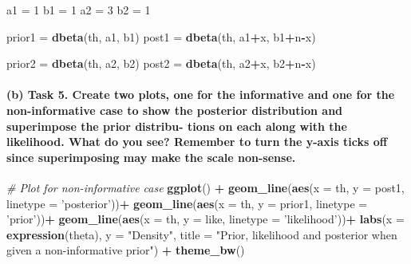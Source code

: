 \documentclass[]{article}
\newenvironment{Shaded}{\begin{snugshade}}{\end{snugshade}}
\newcommand{\KeywordTok}[1]{\textcolor[rgb]{0.13,0.29,0.53}{\textbf{#1}}}
\newcommand{\DataTypeTok}[1]{\textcolor[rgb]{0.13,0.29,0.53}{#1}}
\newcommand{\DecValTok}[1]{\textcolor[rgb]{0.00,0.00,0.81}{#1}}
\newcommand{\StringTok}[1]{\textcolor[rgb]{0.31,0.60,0.02}{#1}}
\newcommand{\CommentTok}[1]{\textcolor[rgb]{0.56,0.35,0.01}{\textit{#1}}}
\newcommand{\OperatorTok}[1]{\textcolor[rgb]{0.81,0.36,0.00}{\textbf{#1}}}
\newcommand{\NormalTok}[1]{#1}
\let\oldparagraph\paragraph
\renewcommand{\paragraph}[1]{\oldparagraph{#1}\mbox{}}
\begin{document}
\begin{Shaded}
\begin{Highlighting}[]
\NormalTok{a1 =}\StringTok{ }\DecValTok{1}
\NormalTok{b1 =}\StringTok{ }\DecValTok{1}
\NormalTok{a2 =}\StringTok{ }\DecValTok{3}
\NormalTok{b2 =}\StringTok{ }\DecValTok{1}

\NormalTok{prior1 =}\StringTok{ }\KeywordTok{dbeta}\NormalTok{(th, a1, b1)}
\NormalTok{post1 =}\StringTok{ }\KeywordTok{dbeta}\NormalTok{(th, a1}\OperatorTok{+}\NormalTok{x, b1}\OperatorTok{+}\NormalTok{n}\OperatorTok{-}\NormalTok{x)}

\NormalTok{prior2 =}\StringTok{ }\KeywordTok{dbeta}\NormalTok{(th, a2, b2)}
\NormalTok{post2 =}\StringTok{ }\KeywordTok{dbeta}\NormalTok{(th, a2}\OperatorTok{+}\NormalTok{x, b2}\OperatorTok{+}\NormalTok{n}\OperatorTok{-}\NormalTok{x)}
\end{Highlighting}
\end{Shaded}

\paragraph{(b) Task 5. Create two plots, one for the informative and one
for the non-informative case to show the posterior distribution and
superimpose the prior distribu- tions on each along with the likelihood.
What do you see? Remember to turn the y-axis ticks off since
superimposing may make the scale
non-sense.}\label{b-task-5.-create-two-plots-one-for-the-informative-and-one-for-the-non-informative-case-to-show-the-posterior-distribution-and-superimpose-the-prior-distribu--tions-on-each-along-with-the-likelihood.-what-do-you-see-remember-to-turn-the-y-axis-ticks-off-since-superimposing-may-make-the-scale-non-sense.}

\begin{Shaded}
\begin{Highlighting}[]
\CommentTok{# Plot for non-informative case}
\KeywordTok{ggplot}\NormalTok{() }\OperatorTok{+}\StringTok{ }
\StringTok{  }\KeywordTok{geom_line}\NormalTok{(}\KeywordTok{aes}\NormalTok{(}\DataTypeTok{x =}\NormalTok{ th, }\DataTypeTok{y =}\NormalTok{ post1, }\DataTypeTok{linetype =} \StringTok{'posterior'}\NormalTok{))}\OperatorTok{+}
\StringTok{  }\KeywordTok{geom_line}\NormalTok{(}\KeywordTok{aes}\NormalTok{(}\DataTypeTok{x =}\NormalTok{ th, }\DataTypeTok{y =}\NormalTok{ prior1, }\DataTypeTok{linetype =} \StringTok{'prior'}\NormalTok{))}\OperatorTok{+}
\StringTok{  }\KeywordTok{geom_line}\NormalTok{(}\KeywordTok{aes}\NormalTok{(}\DataTypeTok{x =}\NormalTok{ th, }\DataTypeTok{y =}\NormalTok{ like, }\DataTypeTok{linetype =} \StringTok{'likelihood'}\NormalTok{))}\OperatorTok{+}
\StringTok{  }\KeywordTok{labs}\NormalTok{(}\DataTypeTok{x =} \KeywordTok{expression}\NormalTok{(theta), }\DataTypeTok{y =} \StringTok{"Density"}\NormalTok{, }\DataTypeTok{title =} \StringTok{"Prior, likelihood and posterior when given a non-informative prior"}\NormalTok{) }\OperatorTok{+}\StringTok{ }\KeywordTok{theme_bw}\NormalTok{()}
\end{Highlighting}
\end{Shaded}
\end{document}

